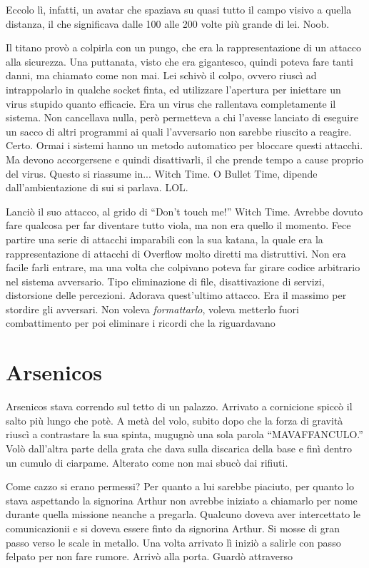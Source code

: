     Eccolo lì, infatti, un avatar che spaziava su quasi tutto il campo visivo a quella distanza, il che significava
    dalle 100 alle 200 volte più grande di lei. Noob.

    Il titano provò a colpirla con un pungo, che era la rappresentazione di un attacco alla sicurezza. Una puttanata,
    visto che era gigantesco, quindi poteva fare tanti danni, ma chiamato come non mai. Lei schivò il colpo, ovvero
    riuscì ad intrappolarlo in qualche socket finta, ed utilizzare l'apertura per iniettare un virus stupido quanto
    efficacie. Era un virus che rallentava completamente il sistema. Non cancellava nulla, però permetteva a chi
    l'avesse lanciato di eseguire un sacco di altri programmi ai quali l'avversario non sarebbe riuscito a reagire.
    Certo. Ormai i sistemi hanno un metodo automatico per bloccare questi attacchi. Ma devono accorgersene e quindi
    disattivarli, il che prende tempo a cause proprio del virus. Questo si riassume in... Witch Time. O Bullet Time,
    dipende dall'ambientazione di sui si parlava. LOL.

    Lanciò il suo attacco, al grido di ``Don't touch me!'' Witch Time. Avrebbe dovuto fare qualcosa per far diventare
    tutto viola, ma non era quello il momento. Fece partire una serie di attacchi imparabili con la sua katana, la quale
    era la rappresentazione di attacchi di Overflow molto diretti ma distruttivi. Non era facile farli entrare, ma una
    volta che colpivano poteva far girare codice arbitrario nel sistema avversario. Tipo eliminazione di file,
    disattivazione di servizi, distorsione delle percezioni. Adorava quest'ultimo attacco. Era il massimo per stordire
    gli avversari. Non voleva \emph{formattarlo}, voleva metterlo fuori combattimento per poi eliminare i ricordi che la
    riguardavano
    

  \section*{Arsenicos}

    Arsenicos stava correndo sul tetto di un palazzo. Arrivato a cornicione spiccò il salto più lungo che potè. A metà
    del volo, subito dopo che la forza di gravità riuscì a contrastare la sua spinta, mugugnò una sola parola
    ``MAVAFFANCULO.'' Volò dall'altra parte della grata che dava sulla discarica della base e finì dentro un cumulo di
    ciarpame. Alterato come non mai sbucò dai rifiuti.

    Come cazzo si erano permessi? Per quanto a lui sarebbe piaciuto, per quanto lo stava aspettando la signorina Arthur
    non avrebbe iniziato a chiamarlo per nome durante quella missione neanche a pregarla. Qualcuno doveva aver
    intercettato le comunicazionii e si doveva essere finto da signorina Arthur. Si mosse di gran passo verso
    le scale in metallo. Una volta arrivato lì iniziò a salirle con passo felpato per non fare rumore. Arrivò alla
    porta. Guardò attraverso 
